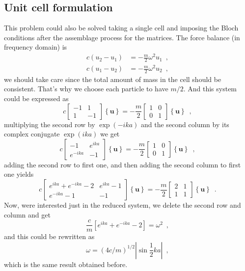 \documentclass[12pt,letterpaper]{article}
\begin{document}
\subsection{Unit cell formulation}
This problem could also be solved taking a single cell and imposing the Bloch conditions after the assemblage process for the matrices. The force balance (in frequency domain) is
\begin{align*}
c(u_2 - u_1) &= -\frac{m}{2} \omega^2 u_1 \enspace ,\\
c(u_1 - u_2) &= -\frac{m}{2} \omega^2 u_2 \enspace ,
\end{align*}
we should take care since the total amount of mass in the cell should be consistent. That's why we choose each particle to have $m/2$. And this system could be expressed as
\begin{equation}
c\left[ \begin{array}{cc}
-1 & 1 \\ 
1 & -1
\end{array}  \right] \left\lbrace \mathbf{u} \right\rbrace =
-\frac{m}{2}\left[ \begin{array}{cc}
1 & 0 \\ 
0 & 1
\end{array}  \right] \left\lbrace \mathbf{u} \right\rbrace \enspace ,
\end{equation}
multiplying the second row by $\exp(-ika)$ and the second column by its complex conjugate $\exp(ika)$ we get
\begin{equation*}
c\left[ \begin{array}{cc}
-1 & e^{ika} \\ 
e^{-ika} & -1
\end{array}  \right] \left\lbrace \mathbf{u} \right\rbrace =
-\frac{m}{2}\left[ \begin{array}{cc}
1 & 0 \\ 
0 & 1
\end{array}  \right] \left\lbrace \mathbf{u} \right\rbrace \enspace ,
\end{equation*}
adding the second row to first one, and then adding the second column to first one yields
\begin{equation*}
c\left[ \begin{array}{cc}
e^{ika}+e^{-ika}-2 & e^{ika}-1 \\ 
e^{-ika}-1 & -1
\end{array}  \right] \left\lbrace \mathbf{u} \right\rbrace =
-\frac{m}{2}\left[ \begin{array}{cc}
2 & 1 \\ 
1 & 1
\end{array}  \right] \left\lbrace \mathbf{u} \right\rbrace \enspace .
\end{equation*}
Now, were interested just in the reduced system, we delete the second row and column and get
\begin{equation}
\frac{c}{m}\left[ e^{ika}+e^{-ika}-2 \right] = \omega^2 \enspace ,
\end{equation}
and this could be rewritten as
\begin{equation}
\omega = (4c/m)^{1/2}\left\vert \sin \frac{1}{2} ka\right\vert \enspace ,
\end{equation}
which is the same result obtained before.
\end{document}
